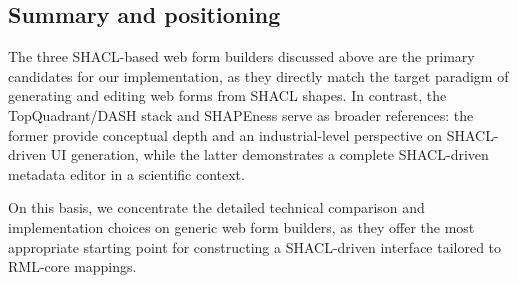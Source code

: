 \subsection{Summary and positioning}

The three SHACL-based web form builders discussed above are the primary candidates for our implementation, as they directly match the target paradigm of generating and editing web forms from SHACL shapes. In contrast, the TopQuadrant/DASH stack and SHAPEness serve as broader references: the former provide conceptual depth and an industrial-level perspective on SHACL-driven UI generation, while the latter demonstrates a complete SHACL-driven metadata editor in a scientific context.\cite{dash-forms}\cite{shapeness-paper}

On this basis, we concentrate the detailed technical comparison and implementation choices on generic web form builders, as they offer the most appropriate starting point for constructing a SHACL-driven interface tailored to RML-core mappings.
